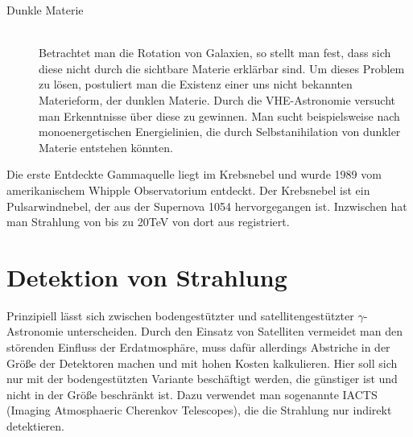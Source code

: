 \begin{description}
\item[Dunkle Materie]\hfill \\
Betrachtet man die Rotation von Galaxien, so stellt man fest, dass sich diese nicht durch die sichtbare Materie erklärbar sind. Um dieses Problem zu lösen, postuliert man die Existenz einer uns nicht bekannten Materieform, der dunklen Materie. Durch die VHE-Astronomie versucht man Erkenntnisse über diese zu gewinnen. Man sucht beispielsweise nach monoenergetischen Energielinien, die durch Selbstanihilation von dunkler Materie entstehen könnten.
\end{description}

Die erste Entdeckte Gammaquelle liegt im Krebsnebel und wurde  1989 vom amerikanischem Whipple Observatorium entdeckt\cite{Crab1}. Der Krebsnebel ist ein Pulsarwindnebel, der aus der Supernova 1054 hervorgegangen ist. Inzwischen hat man Strahlung von bis zu 20TeV von dort aus registriert.

\section{Detektion von Strahlung}
Prinzipiell lässt sich zwischen bodengestützter und satellitengestützter $\gamma$-Astronomie unterscheiden. Durch den Einsatz von Satelliten vermeidet man den störenden Einfluss der Erdatmosphäre, muss dafür allerdings Abstriche in der Größe der Detektoren machen und mit hohen Kosten kalkulieren. Hier soll sich nur mit der bodengestützten Variante beschäftigt werden, die günstiger ist und nicht in der Größe beschränkt ist. Dazu verwendet man sogenannte IACTS (Imaging Atmosphaeric Cherenkov Telescopes), die die Strahlung nur indirekt detektieren.

